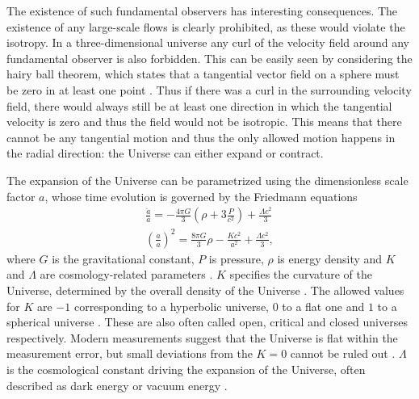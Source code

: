 \documentclass[english, twoside]{HYgradu}
\begin{document}
The existence of such fundamental observers has interesting consequences. The existence of any large-scale flows is clearly prohibited, as these would violate the isotropy. In a three-dimensional universe any curl of the velocity field around any fundamental observer is also forbidden. This can be easily seen by considering the hairy ball theorem, which states that a tangential vector field on a sphere must be zero in at least one point \citep{renteln2013manifolds}. Thus if there was a curl in the surrounding velocity field, there would always still be at least one direction in which the tangential velocity is zero and thus the field would not be isotropic. This means that there cannot be any tangential motion and thus the only allowed motion happens in the radial direction: the Universe can either expand or contract.

The expansion of the Universe can be parametrized using the dimensionless scale factor $a$, whose time evolution is governed by the Friedmann equations
\begin{align}\label{friedmann1}
\frac{\ddot{a}}{a} = -\frac{4\pi G}{3} \left( \rho + 3 \frac{P}{c^2} \right) + \frac{\Lambda c^2}{3} \\ \label{friedmann2}
{\left( \frac{\dot{a}}{a} \right)}^2 = \frac{8\pi G}{3}\rho - \frac{Kc^2}{a^2} + \frac{\Lambda c^2}{3},
\end{align}
where $G$ is the gravitational constant, $P$ is pressure, $\rho$ is energy density and $K$ and $\Lambda$ are cosmology-related parameters \citep{mo2010galaxy}. $K$ specifies the curvature of the Universe, determined by the overall density of the Universe \citep{mo2010galaxy}. The allowed values for $K$ are $-1$ corresponding to a hyperbolic universe, $0$ to a flat one and $1$ to a spherical universe \citep{mo2010galaxy}. These are also often called open, critical and closed universes respectively. Modern measurements suggest that the Universe is flat within the measurement error, but small deviations from the $K=0$ cannot be ruled out \citep{planck2016resultsI}. $\Lambda$ is the cosmological constant driving the expansion of the Universe, often described as dark energy or vacuum energy \citep{mo2010galaxy}.
\end{document}
